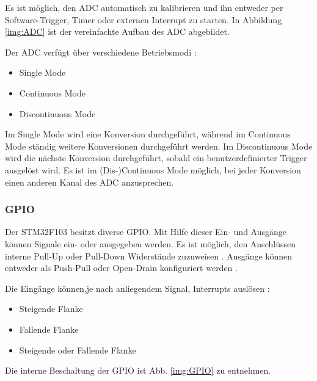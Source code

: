 Es ist möglich, den \ac{ADC} automatisch zu kalibrieren und ihn entweder per Software-Trigger, Timer oder externen Interrupt zu starten. 
In Abbildung \ref{img:ADC} ist der vereinfachte Aufbau des \ac{ADC} abgebildet.

\smallskip 

Der \ac{ADC} verfügt über verschiedene Betriebsmodi \citep{STM32_Ref}:
\begin{itemize}
    \item Single Mode 
    \item Continuous Mode
    \item Discontinuous Mode
\end{itemize}

Im Single Mode wird eine Konversion durchgeführt, während im Continuous Mode ständig weitere Konversionen durchgeführt werden. Im Discontinuous Mode
wird die nächste Konversion durchgeführt, sobald ein benutzerdefinierter Trigger ausgelöst wird. Es ist im (Dis-)Continuous Mode möglich, bei 
jeder Konversion einen anderen Kanal des \ac{ADC} anzusprechen.

\newpage

\subsubsection{GPIO}

Der STM32F103 besitzt diverse \acs{GPIO}. Mit Hilfe dieser Ein- und Ausgänge können Signale ein- oder ausgegeben werden. Es ist möglich,
den Anschlüssen interne Pull-Up oder Pull-Down Widerstände zuzuweisen \citep{STM32_Datasheet}. Ausgänge können entweder als Push-Pull oder Open-Drain
konfiguriert werden \citep{STM32_Ref}.

\smallskip

Die Eingänge können,je nach anliegendem Signal, Interrupts auslösen \citep{STM32_Ref}:
\begin{itemize}
    \item Steigende Flanke
    \item Fallende Flanke
    \item Steigende oder Fallende Flanke
\end{itemize}

Die interne Beschaltung der \ac{GPIO} ist Abb. \ref{img:GPIO} zu entnehmen.

\vspace{0.5cm}

